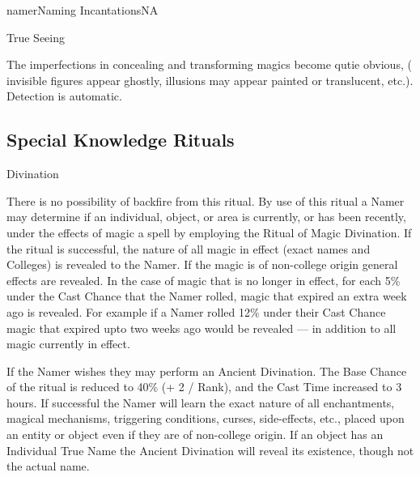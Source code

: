 \begin{college}[2.0]{namer}{Naming Incantations}{NA}
\begin{spell}[S-10]{True Seeing}
\begin{effects}
\begin{inline}
\begin{Description}
\item[True Seeing is is 10+ Rank higher] The imperfections in
concealing and transforming magics become qutie obvious, (\eg
invisible figures appear ghostly, illusions may appear painted or
translucent, etc.). Detection is automatic.
\end{Description}
\end{inline}
\end{effects}
\end{spell}

\subsection{Special Knowledge Rituals}

\begin{ritual}[R-1]{Divination}

\begin{effects}
There is no possibility of backfire from this ritual. By use of this
ritual a Namer may determine if an individual, object, or area is
currently, or has been recently, under the effects of magic a spell by
employing the Ritual of Magic Divination. If the ritual is successful,
the nature of all magic in effect (exact names and Colleges) is
revealed to the Namer. If the magic is of non-college origin general
effects are revealed.  In the case of magic that is no longer in
effect, for each 5\% under the Cast Chance that the Namer rolled,
magic that expired an extra week ago is revealed.  For example if a
Namer rolled 12\% under their Cast Chance magic that expired upto two
weeks ago would be revealed --- in addition to all magic currently in
effect.

If the Namer wishes they may perform an Ancient Divination.  The Base
Chance of the ritual is reduced to 40\% (+ 2 / Rank), and the Cast Time
increased to 3 hours.  If successful the Namer will learn the exact
nature of all enchantments, magical mechanisms, triggering conditions,
curses, side-effects, etc., placed upon an entity or object even if
they are of non-college origin. If an object has an Individual True
Name the Ancient Divination will reveal its existence, though not the
actual name.
\end{effects}
\end{ritual}


\end{college}
